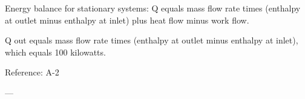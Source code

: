Energy balance for stationary systems:  
Q equals mass flow rate times (enthalpy at outlet minus enthalpy at inlet) plus heat flow minus work flow.  

Q out equals mass flow rate times (enthalpy at outlet minus enthalpy at inlet), which equals 100 kilowatts.  

Reference: A-2  

---